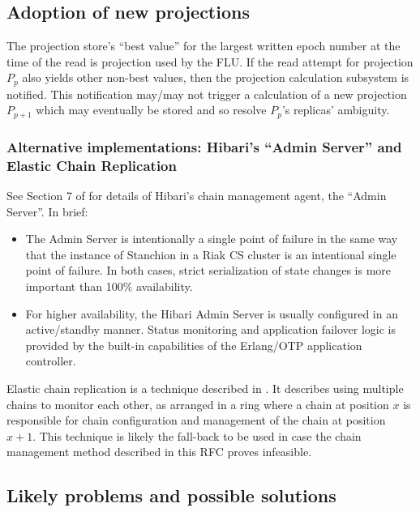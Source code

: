 \documentclass[preprint,10pt]{sigplanconf}
\begin{document}
\subsection{Adoption of new projections}

The projection store's ``best value'' for the largest written epoch
number at the time of the read is projection used by the FLU.
If the read attempt for projection $P_p$
also yields other non-best values, then the
projection calculation subsystem is notified.  This notification
may/may not trigger a calculation of a new projection $P_{p+1}$ which
may eventually be stored and so
resolve $P_p$'s replicas' ambiguity.

\subsubsection{Alternative implementations: Hibari's ``Admin Server''
  and Elastic Chain Replication}

See Section 7 of \cite{cr-theory-and-practice} for details of Hibari's
chain management agent, the ``Admin Server''.  In brief:

\begin{itemize}
\item The Admin Server is intentionally a single point of failure in
  the same way that the instance of Stanchion in a Riak CS cluster
  is an intentional single
  point of failure.  In both cases, strict
  serialization of state changes is more important than 100\%
  availability.

\item For higher availability, the Hibari Admin Server is usually
  configured in an active/standby manner.  Status monitoring and
  application failover logic is provided by the built-in capabilities
  of the Erlang/OTP application controller.

\end{itemize}

Elastic chain replication is a technique described in
\cite{elastic-chain-replication}.  It describes using multiple chains
to monitor each other, as arranged in a ring where a chain at position
$x$ is responsible for chain configuration and management of the chain
at position $x+1$.  This technique is likely the fall-back to be used
in case the chain management method described in this RFC proves
infeasible.

\subsection{Likely problems and possible solutions}
\label{sub:likely-problems}
\end{document}
